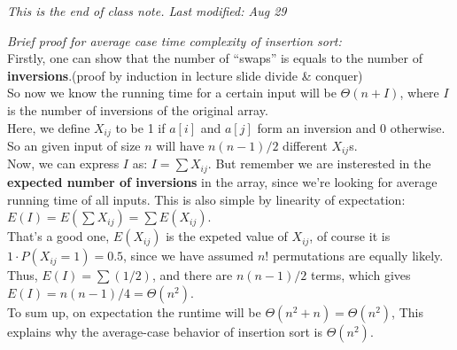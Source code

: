 \documentclass[11pt, a4paper]{COMP3711}
\begin{document}
\begin{spacing}{1.5}
    {\it This is the end of class note. Last modified: Aug 29}


    \newpage
    {\it Brief proof for average case time complexity of 
    insertion sort:} \\
    Firstly, one can show that the number of ``swaps'' 
    is equals to the number of {\bf inversions}.(proof by induction in 
    lecture slide divide \& conquer)\\
    So now we know the running time for a certain input
    will be $\Theta(n+I)$, 
    where $I$ is the number of inversions of the original array.\\
    Here, we define $X_{ij}$ to be 1 if $a[i]$ and $a[j]$ form 
    an inversion and 0 otherwise. So an given input of size $n$
    will have $n(n-1)/2$ different $X_{ij}$s.\\
    Now, we can express $I$ as: $I=\sum X_{ij}$. But 
    remember we are insterested in the {\bf expected number 
    of inversions} in the array, since we're looking for average 
    running time of all inputs. This is also simple by 
    linearity of expectation: $E(I)=E(\sum X_{ij})=\sum E(X_{ij})$.\\
    That's a good one, $E(X_{ij})$ is the expeted value
    of $X_{ij}$, of course it is $1\cdot P(X_{ij}=1)=0.5$, 
    since we have assumed $n!$ permutations are equally likely.\\
    Thus, $E(I)=\sum (1/2)$, and there are $n(n-1)/2$ terms,
    which gives $E(I)=n(n-1)/4=\Theta(n^2)$.\\
    To sum up, on expectation the runtime will be
    $\Theta(n^2+n)=\Theta(n^2)$, This explains why the average-case 
    behavior of insertion sort is $\Theta(n^2)$.
\end{spacing}
\end{document}
